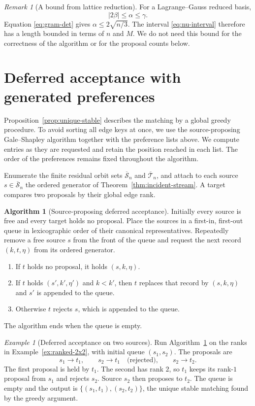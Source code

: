 \documentclass[11pt]{amsart}
\theoremstyle{definition}
\newtheorem{algorithm}[theorem]{Algorithm}
\theoremstyle{remark}
\newtheorem{remark}[theorem]{Remark}
\newtheorem{example}[theorem]{Example}
\newcommand{\Sbar}{\overline{\mathcal S}_n}
\newcommand{\Tbar}{\overline{\mathcal T}_n}
\begin{document}
\begin{remark}[A bound from lattice reduction]
\label{rem:size-reduction}
For a Lagrange--Gauss reduced basis,
\[
 |2\beta|\le\alpha\le\gamma.
\]
Equation \eqref{eq:gram-det} gives $\alpha\le2\sqrt{n/3}$.  The interval
\eqref{eq:nu-interval} therefore has a length bounded in terms of $n$ and $M$.
We do not need this bound for the correctness of the algorithm or for the
proposal counts below.
\end{remark}

\section{Deferred acceptance with generated preferences}
\label{sec:deferred-acceptance}

Proposition~\ref{prop:unique-stable} describes the matching by a global greedy
procedure.  To avoid sorting all edge keys at once, we use the
source-proposing Gale--Shapley algorithm \cite{GaleShapley} together with the
preference lists above.  We compute entries as they are requested and retain
the position reached in each list.  The order of the preferences remains
fixed throughout the algorithm.

Enumerate the finite residual orbit sets $\Sbar$ and $\Tbar$, and attach to
each source $s\in\Sbar$ the ordered generator of
Theorem~\ref{thm:incident-stream}.  A target compares two proposals by their
global edge rank.

\begin{algorithm}[Source-proposing deferred acceptance]\label{alg:lazy-da}
Initially every source is free and every target holds no proposal.
Place the sources in a first-in, first-out queue in lexicographic order of their
canonical representatives.  Repeatedly remove a free source $s$ from the
front of the queue and request the next record $(k,t,\eta)$ from its ordered
generator.
\begin{enumerate}
\item If $t$ holds no proposal, it holds $(s,k,\eta)$.
\item If $t$ holds $(s',k',\eta')$ and $k<k'$, then $t$ replaces
that record by $(s,k,\eta)$ and $s'$ is appended to the queue.
\item Otherwise $t$ rejects $s$, which is appended to the queue.
\end{enumerate}
The algorithm ends when the queue is empty.
\end{algorithm}

\begin{example}[Deferred acceptance on two sources]
\label{ex:DA-2x2}
Run Algorithm~\ref{alg:lazy-da} on the ranks in
Example~\ref{ex:ranked-2x2}, with initial queue $(s_1,s_2)$.  The proposals
are
\[
 s_1\longrightarrow t_1,
 \qquad
 s_2\longrightarrow t_1\quad\text{(rejected)},
 \qquad
 s_2\longrightarrow t_2.
\]
The first proposal is held by $t_1$.  The second has rank $2$, so $t_1$ keeps
its rank-$1$ proposal from $s_1$ and rejects $s_2$.  Source $s_2$ then
proposes to $t_2$.  The queue is empty and the output is
$\{(s_1,t_1),(s_2,t_2)\}$, the unique stable matching found by the greedy
argument.
\end{example}
\end{document}
